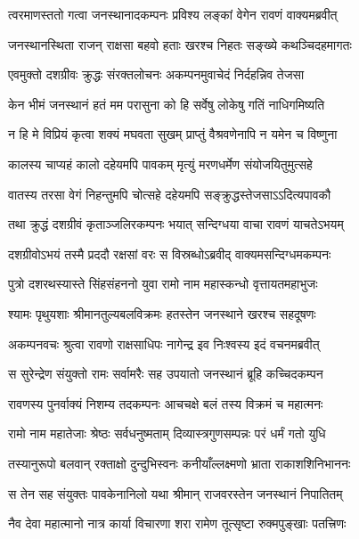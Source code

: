 
\twolineshloka
{त्वरमाणस्ततो गत्वा जनस्थानादकम्पनः}
{प्रविश्य लङ्कां वेगेन रावणं वाक्यमब्रवीत्} %

\twolineshloka
{जनस्थानस्थिता राजन् राक्षसा बहवो हताः}
{खरश्च निहतः सङ्ख्ये कथञ्चिदहमागतः} %

\twolineshloka
{एवमुक्तो दशग्रीवः क्रुद्धः संरक्तलोचनः}
{अकम्पनमुवाचेदं निर्दहन्निव तेजसा} %

\twolineshloka
{केन भीमं जनस्थानं हतं मम परासुना}
{को हि सर्वेषु लोकेषु गतिं नाधिगमिष्यति} %

\twolineshloka
{न हि मे विप्रियं कृत्वा शक्यं मघवता सुखम्}
{प्राप्तुं वैश्रवणेनापि न यमेन च विष्णुना} %

\twolineshloka
{कालस्य चाप्यहं कालो दहेयमपि पावकम्}
{मृत्युं मरणधर्मेण संयोजयितुमुत्सहे} %

\twolineshloka
{वातस्य तरसा वेगं निहन्तुमपि चोत्सहे}
{दहेयमपि सङ्क्रुद्धस्तेजसाऽऽदित्यपावकौ} %

\twolineshloka
{तथा क्रुद्धं दशग्रीवं कृताञ्जलिरकम्पनः}
{भयात् सन्दिग्धया वाचा रावणं याचतेऽभयम्} %

\twolineshloka
{दशग्रीवोऽभयं तस्मै प्रददौ रक्षसां वरः}
{स विस्रब्धोऽब्रवीद् वाक्यमसन्दिग्धमकम्पनः} %

\twolineshloka
{पुत्रो दशरथस्यास्ते सिंहसंहननो युवा}
{रामो नाम महास्कन्धो वृत्तायतमहाभुजः} %

\twolineshloka
{श्यामः पृथुयशाः श्रीमानतुल्यबलविक्रमः}
{हतस्तेन जनस्थाने खरश्च सहदूषणः} %

\twolineshloka
{अकम्पनवचः श्रुत्वा रावणो राक्षसाधिपः}
{नागेन्द्र इव निःश्वस्य इदं वचनमब्रवीत्} %

\twolineshloka
{स सुरेन्द्रेण संयुक्तो रामः सर्वामरैः सह}
{उपयातो जनस्थानं ब्रूहि कच्चिदकम्पन} %

\twolineshloka
{रावणस्य पुनर्वाक्यं निशम्य तदकम्पनः}
{आचचक्षे बलं तस्य विक्रमं च महात्मनः} %

\twolineshloka
{रामो नाम महातेजाः श्रेष्ठः सर्वधनुष्मताम्}
{दिव्यास्त्रगुणसम्पन्नः परं धर्मं गतो युधि} %

\twolineshloka
{तस्यानुरूपो बलवान् रक्ताक्षो दुन्दुभिस्वनः}
{कनीयाँल्लक्ष्मणो भ्राता राकाशशिनिभाननः} %

\twolineshloka
{स तेन सह संयुक्तः पावकेनानिलो यथा}
{श्रीमान् राजवरस्तेन जनस्थानं निपातितम्} %

\twolineshloka
{नैव देवा महात्मानो नात्र कार्या विचारणा}
{शरा रामेण तूत्सृष्टा रुक्मपुङ्खाः पतत्त्रिणः} %

